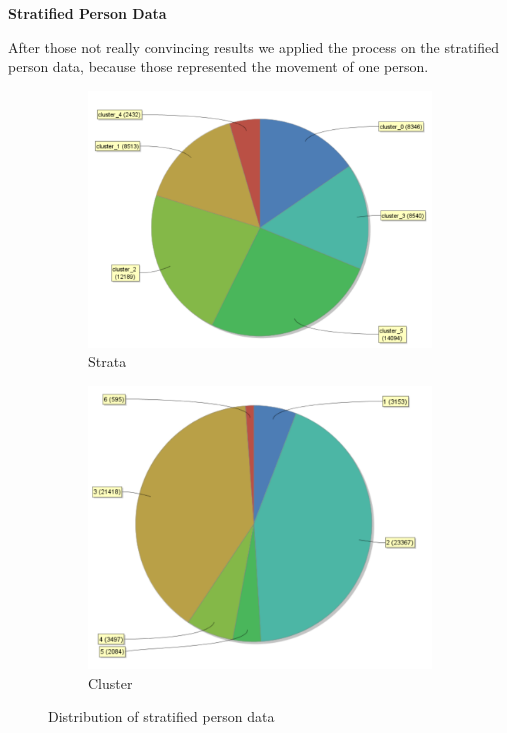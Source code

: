 \textbf{Stratified Person Data}

After those not really convincing results we applied the process on the stratified person data, because those represented the movement of one person.

\begin{figure}[h]
\centering
\begin{subfigure}{.5\textwidth}
  \centering
  \includegraphics[width=.9\linewidth]{vectorclusteringcluster.PNG}
  \caption{Strata}
  \label{fig:VecSt}
\end{subfigure}%
\begin{subfigure}{.5\textwidth}
  \centering
  \includegraphics[width=.9\linewidth]{vectorclusteringstrata.PNG}
  \caption{Cluster}
  \label{fig:VecCl}
\end{subfigure}
\caption{Distribution of stratified person data}
\label{fig:VecDist}
\end{figure}

